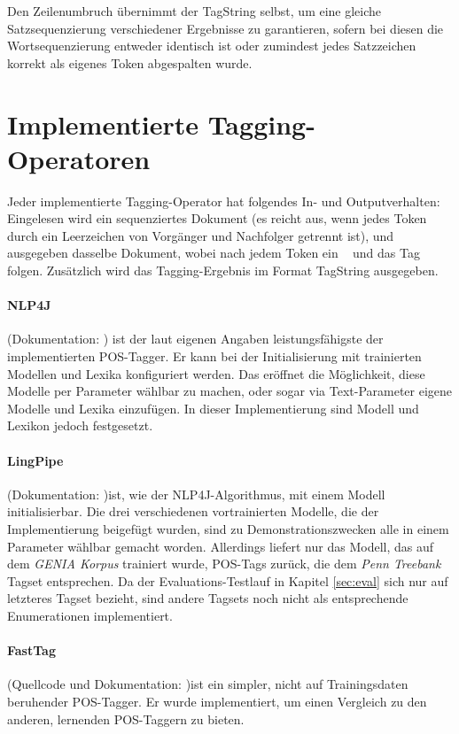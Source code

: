 Den Zeilenumbruch übernimmt der TagString selbst, um eine gleiche Satzsequenzierung verschiedener Ergebnisse zu garantieren, sofern bei diesen die Wortsequenzierung entweder identisch ist oder zumindest jedes Satzzeichen korrekt als eigenes Token abgespalten wurde.

\section{Implementierte Tagging-Operatoren}
Jeder implementierte Tagging-Operator hat folgendes In- und Outputverhalten: Eingelesen wird ein sequenziertes Dokument (es reicht aus, wenn jedes Token durch ein Leerzeichen von Vorgänger und Nachfolger getrennt ist), und ausgegeben dasselbe Dokument, wobei nach jedem Token ein \glqq \ \grqq{} und das Tag folgen. Zusätzlich wird das Tagging-Ergebnis im Format TagString ausgegeben.

\paragraph{NLP4J}
(Dokumentation: \cite{choi}) ist der laut eigenen Angaben leistungsfähigste der implementierten POS-Tagger. Er kann bei der Initialisierung mit trainierten Modellen und Lexika konfiguriert werden. Das eröffnet die Möglichkeit, diese Modelle per Parameter wählbar zu machen, oder sogar via Text-Parameter eigene Modelle und Lexika einzufügen. In dieser Implementierung sind Modell und Lexikon jedoch festgesetzt.
\paragraph{LingPipe}
(Dokumentation: \cite{Lingpipedoc})ist, wie der NLP4J-Algorithmus, mit einem Modell initialisierbar. Die drei verschiedenen vortrainierten Modelle, die der Implementierung beigefügt wurden, sind zu Demonstrationszwecken alle in einem Parameter wählbar gemacht worden. Allerdings liefert nur das Modell, das auf dem \textit{GENIA Korpus} \cite{GENIA} trainiert wurde, POS-Tags zurück, die dem \textit{Penn Treebank} Tagset entsprechen. Da der Evaluations-Testlauf in Kapitel \ref{sec:eval} sich nur auf letzteres Tagset bezieht, sind andere Tagsets noch nicht als entsprechende Enumerationen implementiert.
\paragraph{FastTag}
(Quellcode und Dokumentation: \cite{fasttagdoc})ist ein simpler, nicht auf Trainingsdaten beruhender POS-Tagger. Er wurde implementiert, um einen Vergleich zu den anderen, lernenden POS-Taggern zu bieten.




